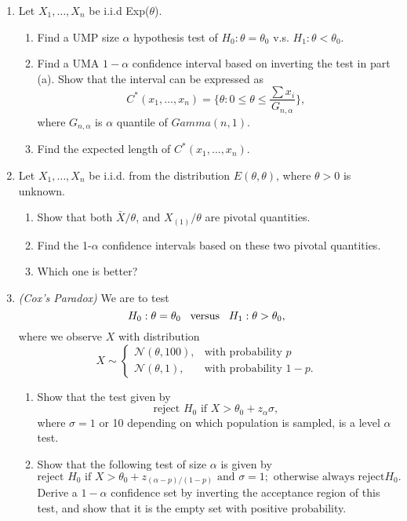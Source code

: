 \documentclass[12pt]{extarticle}
\begin{document}
\begin{enumerate}

	
	\item Let $X_1,\ldots, X_n$ be i.i.d Exp($\theta$). 
	\begin{enumerate}
		\item Find a UMP size $\alpha$ hypothesis test of $H_0: \theta = \theta_0$ v.s. $H_1: \theta < \theta_0$.
		\item Find a UMA $1 - \alpha$ confidence interval based on inverting the test in part (a). Show that the interval can be expressed as $$C^*(x_1,\ldots, x_n) = \Bigg\{\theta: 0\leq \theta\leq \dfrac{\sum x_i}{G_{n,\alpha}}\Bigg\},$$
		where $G_{n,\alpha}$ is $\alpha$ quantile of $Gamma(n,1).$
		\item Find the expected length of $C^*(x_1,\ldots, x_n)$.
	\end{enumerate}

	\vspace{6cm}
	
	\item Let $X_1,\dots,X_n$ be i.i.d. from the distribution $E(\theta,\theta)$, where $\theta>0$ is unknown.
	\begin{enumerate}
	\item Show that both $\bar{X}/\theta$, and $X_{(1)}/\theta$ are pivotal quantities.
	\item  Find the 1-$\alpha$ confidence intervals based on these two pivotal quantities.
	\item Which one is better?
	\end{enumerate}
\vspace{8cm}

\item \textit{(Cox's Paradox)} We are to test $$H_0:\theta = \theta_0\hspace{3mm}\text{versus}\hspace{3mm} H_1:\theta>\theta_0,$$
where we observe $X$ with distribution 
$$X\sim \begin{cases}
\mathcal N(\theta,100),& \text{with probability } p\\
\mathcal N(\theta, 1),              & \text{with probability } 1-p.
\end{cases}$$
\begin{enumerate}
	\item Show that the test given by \[\text{reject }H_0 \text{ if }X>\theta_0+z_\alpha\sigma, \]
	where $\sigma = 1$ or 10 depending on which population is sampled, is a level $\alpha$ test.
	\item Show that the following test of size $\alpha$ is given by 
	\[\text{reject }H_0 \text{ if }X>\theta_0+z_{(\alpha-p)/(1-p)} \text{ and }\sigma=1;\text{ otherwise always reject} H_0.\]
	Derive a $1-\alpha$ confidence set by inverting the acceptance region of this test, and show that it is the empty set with positive probability.
\end{enumerate}
\end{enumerate}
\end{document}
